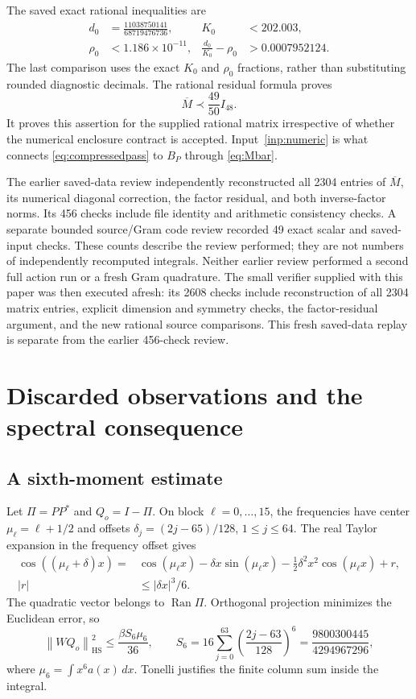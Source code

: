 \documentclass[11pt,a4paper]{article}
\numberwithin{equation}{section}
\theoremstyle{definition}\newtheorem{definition}[theorem]{Definition}
\theoremstyle{remark}\newtheorem{remark}[theorem]{Remark}
\newcommand{\norm}[1]{\left\|#1\right\|}
\newcommand{\ran}{\operatorname{Ran}}
\newcommand{\HS}{\mathrm{HS}}
\newcommand{\Mbar}{\overline M}
\begin{document}
The saved exact rational inequalities are
\begin{align}\label{eq:factorvalues}
 d_0&=\frac{11038750141}{68719476736},&
 K_0&<202.003,\nonumber\\
 \rho_0&<1.186\times10^{-11},&
 \frac{d_0}{K_0}-\rho_0&>0.0007952124.
\end{align}
The last comparison uses the exact $K_0$ and $\rho_0$ fractions, rather than substituting rounded diagnostic decimals. The rational residual formula proves
\begin{equation}\label{eq:compressedpass}
 \Mbar\prec\frac{49}{50}I_{48}.
\end{equation}
It proves this assertion for the supplied rational matrix irrespective of whether the numerical enclosure contract is accepted. Input~\ref{inp:numeric} is what connects \eqref{eq:compressedpass} to $B_P$ through \eqref{eq:Mbar}.

The earlier saved-data review independently reconstructed all 2304 entries of $\Mbar$, its numerical diagonal correction, the factor residual, and both inverse-factor norms. Its 456 checks include file identity and arithmetic consistency checks. A separate bounded source/Gram code review recorded 49 exact scalar and saved-input checks. These counts describe the review performed; they are not numbers of independently recomputed integrals. Neither earlier review performed a second full action run or a fresh Gram quadrature. The small verifier supplied with this paper was then executed afresh: its 2608 checks include reconstruction of all 2304 matrix entries, explicit dimension and symmetry checks, the factor-residual argument, and the new rational source comparisons. This fresh saved-data replay is separate from the earlier 456-check review.

\section{Discarded observations and the spectral consequence}\label{sec:complement}
\subsection{A sixth-moment estimate}
Let $\Pi=PP^*$ and $Q_o=I-\Pi$. On block $\ell=0,\ldots,15$, the frequencies have center $\mu_\ell=\ell+1/2$ and offsets
$\delta_j=(2j-65)/128$, $1\le j\le64$.
The real Taylor expansion in the frequency offset gives
\begin{align}\label{eq:cosTaylor}
 \cos((\mu_\ell+\delta)x)
 ={}&\cos(\mu_\ell x)-\delta x\sin(\mu_\ell x)
 -\tfrac12\delta^2x^2\cos(\mu_\ell x)+r,\nonumber\\
 |r|&\le|\delta x|^3/6.
\end{align}
The quadratic vector belongs to $\ran\Pi$. Orthogonal projection minimizes the Euclidean error, so
\begin{equation}\label{eq:HS}
 \norm{WQ_o}_{\HS}^2
 \le\frac{\beta S_6\mu_6}{36},\qquad
 S_6=16\sum_{j=0}^{63}\left(\frac{2j-63}{128}\right)^6
 =\frac{9800300445}{4294967296},
\end{equation}
where $\mu_6=\int x^6a(x)\,dx$. Tonelli justifies the finite column sum inside the integral.
\end{document}
